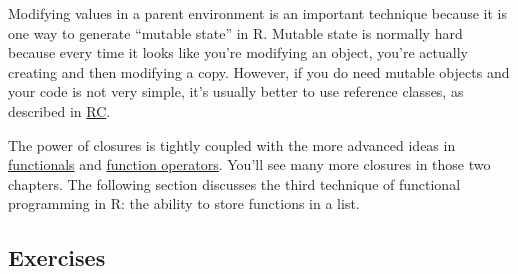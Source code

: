 \begin{Shaded}
\begin{Highlighting}[]
\StringTok{ }
\StringTok{ }
  \StringTok{ }\StringTok{ }
\NormalTok{\}}
\StringTok{ }
  \StringTok{ }
    \StringTok{ }\StringTok{ }
  \NormalTok{\}}
\NormalTok{\}}
\end{Highlighting}
\end{Shaded}

Modifying values in a parent environment is an important technique
because it is one way to generate ``mutable state'' in R. Mutable state
is normally hard because every time it looks like you're modifying an
object, you're actually creating and then modifying a copy. However, if
you do need mutable objects and your code is not very simple, it's
usually better to use reference classes, as described in
\hyperref[rc]{RC}.

The power of closures is tightly coupled with the more advanced ideas in
\hyperref[functionals]{functionals} and
\hyperref[function-operators]{function operators}. You'll see many more
closures in those two chapters. The following section discusses the
third technique of functional programming in R: the ability to store
functions in a list.

\subsection{Exercises}

